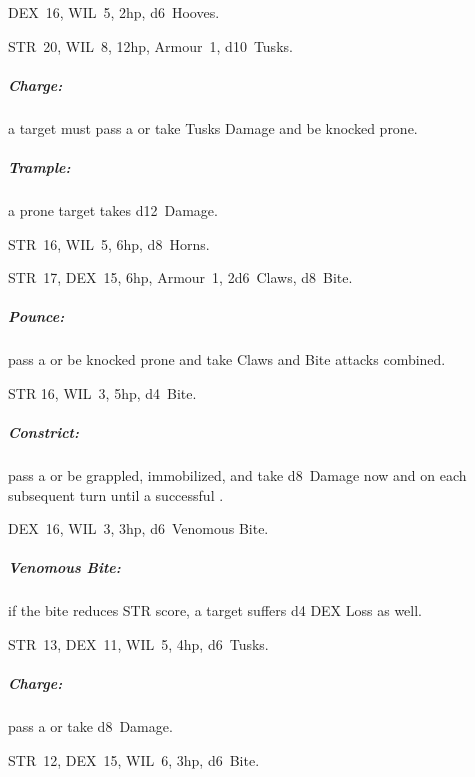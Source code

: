 \documentclass[itdr]{subfiles}
\begin{document}
\vfill

DEX~16, WIL~5, 2hp, d6~Hooves.

\vfill

STR~20, WIL~8, 12hp, Armour~1, d10~Tusks.
\subparagraph{Charge:} a target must pass a  or take Tusks Damage and be knocked prone.
\subparagraph{Trample:} a prone target takes d12~Damage.

\vfill

STR~16, WIL~5, 6hp, d8~Horns.

\vfill

STR~17, DEX~15, 6hp, Armour~1, 2d6~Claws, d8~Bite.
\subparagraph{Pounce:} pass a  or be knocked prone and take Claws and Bite attacks combined.

\vfill

STR 16, WIL~3, 5hp, d4~Bite.
\subparagraph{Constrict:} pass a  or be grappled, immobilized, and take d8~Damage now and on each subsequent turn until a successful .

\vfill

DEX~16, WIL~3, 3hp, d6~Venomous Bite.
\subparagraph{Venomous Bite:} if the bite reduces STR score, a target suffers d4 DEX Loss as well.

\vfill

STR~13, DEX~11, WIL~5, 4hp, d6~Tusks.
\subparagraph{Charge:} pass a  or take d8~Damage.

\vfill

STR~12, DEX~15, WIL~6, 3hp, d6~Bite.

\vfill
~
\end{document}
